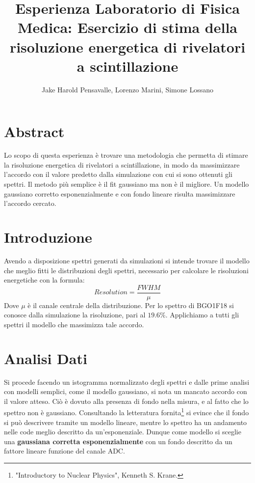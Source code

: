 \documentclass[a4paper]{article}
\title{Esperienza Laboratorio di Fisica Medica: Esercizio di stima della risoluzione energetica di rivelatori a scintillazione}
\author{Jake Harold Pensavalle, Lorenzo Marini, Simone Lossano}
\begin{document}
	\maketitle
	\newpage
	\tableofcontents
	\newpage
\section{Abstract}
Lo scopo di questa esperienza è trovare una metodologia che permetta di stimare la risoluzione energetica di rivelatori a scintillazione, in modo da massimizzare l'accordo con il valore predetto dalla simulazione con cui si sono ottenuti gli spettri. Il metodo più semplice è il fit gaussiano ma non è il migliore. Un modello gaussiano corretto esponenzialmente e con fondo lineare risulta massimizzare l'accordo cercato.
\section{Introduzione}
Avendo a disposizione spettri generati da simulazioni si intende trovare il modello che meglio fitti le distribuzioni degli spettri, necessario per calcolare le risoluzioni energetiche con la formula:
\begin{equation}
Resolution=\frac{FWHM}{\mu}
\end{equation}
Dove $\mu$ è il canale centrale della distribuzione. Per lo spettro di BGO1F18 si conosce dalla simulazione la risoluzione, pari al $19.6\%$. Applichiamo a tutti gli spettri il modello che massimizza tale accordo.
\section{Analisi Dati}
Si procede facendo un istogramma normalizzato degli spettri e dalle prime analisi con modelli semplici, come il modello gaussiano, si nota un mancato accordo con il valore atteso. Ciò è dovuto alla presenza di fondo nella misura, e al fatto che lo spettro non è gaussiano. Consultando la letteratura fornita\footnote{\label{note1}"Introductory to Nuclear Physics", Kenneth S. Krane.} si evince che il fondo si può descrivere tramite un modello lineare, mentre lo spettro ha un andamento nelle code meglio descritto da un'esponenziale. Dunque come modello si sceglie una \textbf{gaussiana corretta esponenzialmente} con un fondo descritto da un fattore lineare funzione del canale ADC.
\end{document}

